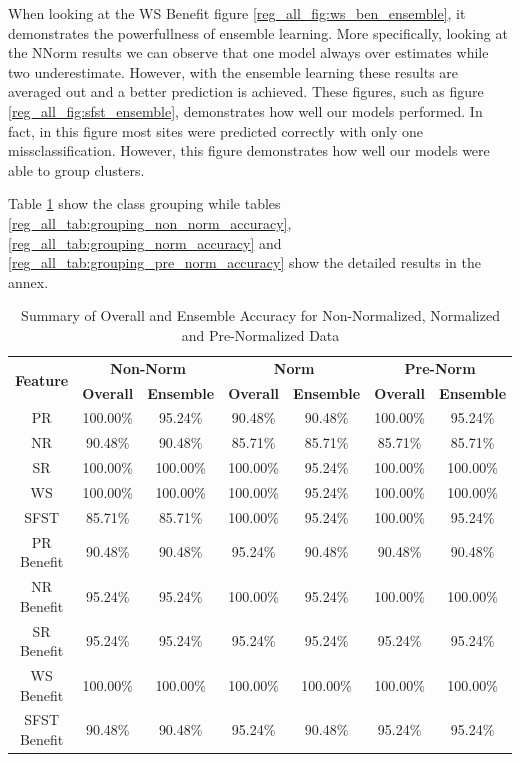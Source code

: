 \documentclass[12pt,letterpaper]{article}
\begin{document}
When looking at the \ac{WS} Benefit figure \ref{reg_all_fig:ws_ben_ensemble}, it demonstrates the powerfullness of ensemble learning.
More specifically, looking at the \ac{NNorm} results we can observe that one model always over estimates while two underestimate.
However, with the ensemble learning these results are averaged out and a better prediction is achieved.
These figures, such as figure \ref{reg_all_fig:sfst_ensemble}, demonstrates how well our models performed.
In fact, in this figure most sites were predicted correctly with only one missclassification.
However, this figure demonstrates how well our models were able to group clusters.


Table \ref{reg_all_tab:summary_class_grouping} show the class grouping while tables \ref{reg_all_tab:grouping_non_norm_accuracy}, \ref{reg_all_tab:grouping_norm_accuracy} and \ref{reg_all_tab:grouping_pre_norm_accuracy} show the detailed results in the annex.


\begin{table}[H]
\centering
\begin{tabular}{|c||c|c||c|c||c|c|}
\hline
\multirow{2}{*}{\textbf{Feature}} & \multicolumn{2}{c||}{\textbf{Non-Norm}} & \multicolumn{2}{c||}{\textbf{Norm}} & \multicolumn{2}{c|}{\textbf{Pre-Norm}} \\
\cline{2-7}
 & \textbf{Overall} & \textbf{Ensemble} & \textbf{Overall} & \textbf{Ensemble} & \textbf{Overall} & \textbf{Ensemble} \\
\hline
PR & 100.00\% & 95.24\% & 90.48\% & 90.48\% & 100.00\% & 95.24\% \\
\hline
NR & 90.48\% & 90.48\% & 85.71\% & 85.71\% & 85.71\% & 85.71\% \\
\hline
SR & 100.00\% & 100.00\% & 100.00\% & 95.24\% & 100.00\% & 100.00\%\\
\hline
WS & 100.00\% & 100.00\% & 100.00\% & 95.24\% & 100.00\% & 100.00\% \\
\hline
SFST & 85.71\% & 85.71\% & 100.00\% & 95.24\% & 100.00\% & 95.24\% \\
\hline

PR Benefit & 90.48\% & 90.48\% & 95.24\% & 90.48\% & 90.48\% & 90.48\% \\
\hline
NR Benefit & 95.24\% & 95.24\% & 100.00\% & 95.24\% & 100.00\% & 100.00\% \\
\hline
SR Benefit & 95.24\% & 95.24\% & 95.24\% & 95.24\% & 95.24\% & 95.24\% \\
\hline
WS Benefit & 100.00\% & 100.00\% & 100.00\% & 100.00\% & 100.00\% & 100.00\% \\
\hline
SFST Benefit & 90.48\% & 90.48\% & 95.24\% & 90.48\% & 95.24\% & 95.24\% \\
\hline
\end{tabular}
\caption{Summary of Overall and Ensemble Accuracy for Non-Normalized, Normalized and Pre-Normalized Data}
\label{reg_all_tab:summary_class_grouping}
\end{table}
\end{document}
